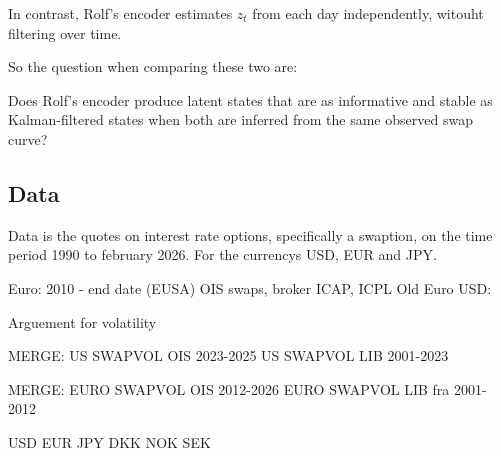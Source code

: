 In contrast, Rolf's encoder estimates $z_t$ from each day independently, witouht filtering over time.

So the question when comparing these two are:

Does Rolf’s encoder produce latent states that are as informative and stable as Kalman-filtered states when both are inferred from the same observed swap curve?






\subsection{Data}


Data is the quotes on interest rate options, specifically a swaption, on the time period 1990 to february 2026. For the currencys USD, EUR and JPY.







Euro: 2010 - end date (EUSA) OIS swaps, broker ICAP, ICPL
Old Euro
USD: 


Arguement for volatility


MERGE:
US SWAPVOL OIS 2023-2025
US SWAPVOL LIB 2001-2023 

MERGE:
EURO SWAPVOL OIS 2012-2026
EURO SWAPVOL LIB fra 2001-2012



USD
EUR
JPY
DKK
NOK
SEK



